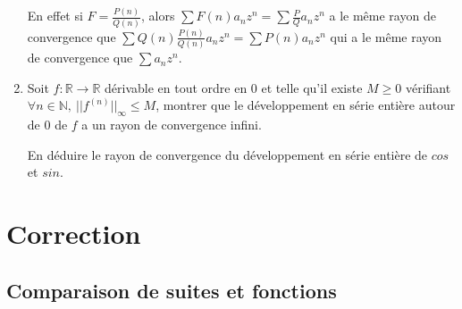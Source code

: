 \documentclass[]{article}
\begin{document}
\begin{enumerate}
En effet si $F = \frac{P(n)}{Q(n)}$, alors $\sum F(n) a_n z^n = \sum \frac{P}{Q} a_n z^n$ a le même rayon de convergence que $\sum Q(n)\frac{P(n)}{Q(n)} a_n z^n = \sum P(n) a_n z^n$ qui a le même rayon de convergence que $\sum a_n z^n$.

\item Soit $f : \mathbb{R} \longrightarrow \mathbb{R}$ dérivable en tout ordre en $0$ et telle qu'il existe $M \geqslant 0$ vérifiant $\forall n \in \mathbb{N}, ~ ||f^{(n)}||_{\infty} \leqslant M$, montrer que le développement en série entière autour de $0$ de $f$ a un rayon de convergence infini.

En déduire le rayon de convergence du développement en série entière de $cos$ et $sin$.

\end{enumerate}

\section{Correction}

\subsection{Comparaison de suites et fonctions}
\end{document}

